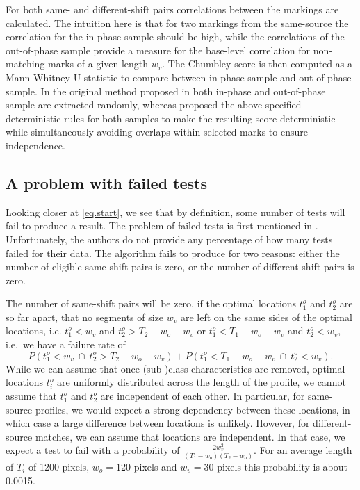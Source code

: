 \documentclass[12pt]{article}
\begin{document}
For both same- and different-shift pairs correlations between the
markings are calculated. The intuition here is that for two markings
from the same-source the correlation for the in-phase sample should be
high, while the correlations of the out-of-phase sample provide a
measure for the base-level correlation for non-matching marks of a given
length \(w_v\). The Chumbley score is then computed as a Mann Whitney U
statistic to compare between in-phase sample and out-of-phase sample. In
the original method proposed in \citet{chumbley} both in-phase and
out-of-phase sample are extracted randomly, whereas \citet{hadler}
proposed the above specified deterministic rules for both samples to
make the resulting score deterministic while simultaneously avoiding
overlaps within selected marks to ensure independence.

\hypertarget{a-problem-with-failed-tests}{%
\subsection{A problem with failed
tests}\label{a-problem-with-failed-tests}}

Looking closer at \autoref{eq.start}, we see that by definition, some
number of tests will fail to produce a result. The problem of failed
tests is first mentioned in \citet{afte-chumbley}. Unfortunately, the
authors do not provide any percentage of how many tests failed for their
data. The algorithm fails to produce for two reasons: either the number
of eligible same-shift pairs is zero, or the number of different-shift
pairs is zero.

The number of same-shift pairs will be zero, if the optimal locations
\(t_1^{o}\) and \(t_2^{o}\) are so far apart, that no segments of size
\(w_v\) are left on the same sides of the optimal locations, i.e.
\(t_1^{o} < w_v\) and \(t_2^{o} > T_2-w_o-w_v\) or
\(t_1^{o} < T_1- w_o - w_v\) and \(t_2^{o} < w_v\), i.e.~we have a
failure rate of \[
P\left( t_1^{o} < w_v \ \cap \ t_2^{o} > T_2-w_o-w_v\right) + P\left( t_1^{o} < T_1- w_o - w_v \ \cap \ t_2^{o} < w_v\right).
\] While we can assume that once (sub-)class characteristics are
removed, optimal locations \(t_i^{o}\) are uniformly distributed across
the length of the profile, we cannot assume that \(t_1^o\) and \(t_2^o\)
are independent of each other. In particular, for same-source profiles,
we would expect a strong dependency between these locations, in which
case a large difference between locations is unlikely. However, for
different-source matches, we can assume that locations are independent.
In that case, we expect a test to fail with a probability of
\(\frac{2 w_v^2}{(T_1-w_o)(T_2-w_o)}\). For an average length of \(T_i\)
of 1200 pixels, \(w_o = 120\) pixels and \(w_v = 30\) pixels this
probability is about 0.0015.
\end{document}
